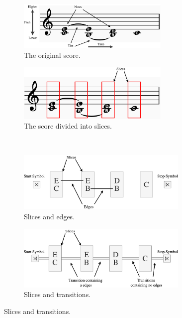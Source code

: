 \documentclass[12pt,a4paper,twoside,openany]{report} \usepackage[pdfborder={0 0 0}]{hyperref}    %
\theoremstyle{definition} \newtheorem{definition}{Definition}[section]
\begin{document}
  \begin{figure}[h] 
    \centering 
    \begin{subfigure}[t]{0.49\textwidth}
      \centering 
      \includegraphics[width=0.8\textwidth]{figs/prep/sliceRep/surface.png}
      \caption{The original score.}
      \label{fig:sliceRepSurface}
    \end{subfigure}
    \hfill
    \begin{subfigure}[t]{0.49\textwidth}
      \includegraphics[width=0.8\textwidth]{figs/prep/sliceRep/slicedSurface.png}
      \caption{The score divided into slices.}
      \label{fig:sliceRepSlicedSurface}
    \end{subfigure}\\
    \begin{subfigure}[t]{0.49\textwidth}
      \includegraphics[width=0.9\textwidth]{figs/prep/sliceRep/slicesEdges.png}
      \caption{Slices and edges.}
      \label{fig:sliceRepSlicesEdges}
    \end{subfigure}
    \hfill
    \begin{subfigure}[t]{0.49\textwidth}
      \includegraphics[width=0.9\textwidth]{figs/prep/sliceRep/sliceTransitions.png}
      \caption{Slices and transitions.}
      \label{fig:sliceRepTransitions}
    \end{subfigure}
    \label{fig:sliceRepresentation} 
  \end{figure}
\end{document}
